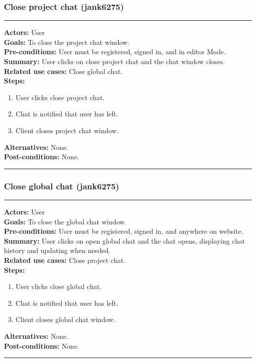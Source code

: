 \documentclass[11pt]{report}
\begin{document}
\subsubsection{Close project chat (jank6275)}
\vspace{2pt}
\hrule
\vspace{8pt}
 \textbf{Actors:} User \\ 
 \textbf{Goals:} To close the project chat window. \\
 \textbf{Pre-conditions:} User must be registered, signed in, and in editor Mode.  \\
 \textbf{Summary:} User clicks on close project chat and the chat window closes. \\ 
 \textbf{Related use cases:} Close global chat. \\ 
 \textbf{Steps:} \begin{enumerate}
  \item User clicks close project chat.
  \item Chat is notified that user has left.
  \item Client closes project chat window.
 \end{enumerate}
 \textbf{Alternatives:} None. \\
 \textbf{Post-conditions:} None. \\
 \vspace{8pt}
\hrule
\newpage
\subsubsection{Close global chat (jank6275)}
\vspace{2pt}
\hrule
\vspace{8pt}
 \textbf{Actors:} User \\ 
 \textbf{Goals:} To close the global chat window. \\
 \textbf{Pre-conditions:} User must be registered, signed in, and anywhere on website.  \\
 \textbf{Summary:} User clicks on open global chat and the chat opens, displaying chat history and updating when needed. \\ 
 \textbf{Related use cases:} Close project chat. \\ 
 \textbf{Steps:} \begin{enumerate}
  \item User clicks close global chat.
  \item Chat is notified that user has left.
  \item Client closes global chat window.
 \end{enumerate}
 \textbf{Alternatives:} None. \\
 \textbf{Post-conditions:} None. \\
 \vspace{8pt}
\hrule
\newpage
\end{document}
